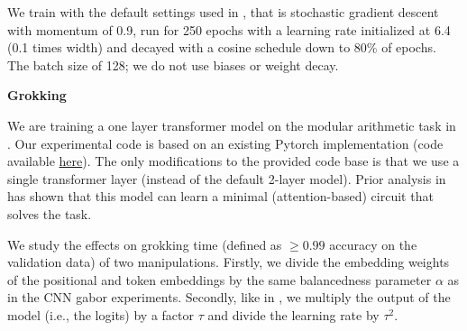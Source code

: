 \documentclass{article}
\theoremstyle{plain}
\theoremstyle{definition}
\theoremstyle{remark}
\begin{document}
We train with the default settings used in \cite{petrini2023deep}, that is stochastic gradient descent with momentum of 0.9, run for 250 epochs with a learning rate initialized at 6.4 (0.1 times width) and decayed with a cosine schedule down to 80\% of epochs. The batch size of 128; we do not use biases or weight decay.

\textbf{Grokking}

We are training a one layer transformer model on the modular arithmetic task in \citet{power2022grokking}.
Our experimental code is based on an existing Pytorch implementation (code available \href{https://github.com/teddykoker/grokking}{here}).
The only modifications to the provided code base is that we use a single transformer layer (instead of the default 2-layer model).
Prior analysis in \citet{nanda2023progress} has shown that this model can learn a minimal (attention-based) circuit that solves the task.

We study the effects on grokking time (defined as $\geq0.99$ accuracy on the validation data) of two manipulations.
Firstly, we divide the embedding weights of the positional and token embeddings by the same balancedness parameter $\alpha$ as in the CNN gabor experiments.
Secondly, like in \citet{kumar2023grokking}, we multiply the output of the model (i.e., the logits) by a factor $\tau$ and divide the learning rate by $\tau^2$.
\end{document}
